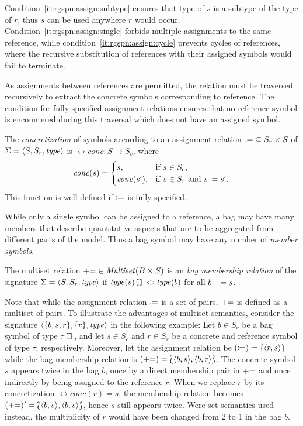 Condition~\ref{it:rgspn:assign:subtype} ensures that type of \(s\) is a subtype of the type of \(r\), thus \(s\) can be used anywhere \(r\) would occur. Condition~\ref{it:rgspn:assign:single} forbids multiple assignments to the same reference, while condition~\ref{it:rgspn:assign:cycle} prevents cycles of references, where the recursive substitution of references with their assigned symbols would fail to terminate.

As assignments between references are permitted, the relation  must be traversed recursively to extract the concrete symbols corresponding to reference. The condition for fully specified assignment relations ensures that no reference symbol is encountered during this traversal which does not have an assigned symbol. 
\begin{dfn}
  The \emph{concretization} of symbols according to an  assignment relation \({\coloneq} \subseteq S_r \times S\) of \(\Sigma = \langle S, S_r, \textrm{\itshape type\/} \rangle\) is \(\rel{conc}\colon S \to S_c\), where
  \begin{equation}
    \textrm{\itshape conc\/}(s) = \begin{cases}
      s, & \text{if \(s \in S_c\),} \\
      \textrm{\itshape conc\/}(s'), & \text{if \(s \in S_r\) and \(s \coloneq s'\).}
    \end{cases}
  \end{equation}
  This function is well-defined if \(\coloneq\) is fully specified.
\end{dfn}

While only a single symbol can be assigned to a reference, a bag may have many members that describe quantitative aspects that are to be aggregated from different parts of the model. Thus a bag symbol may have any number of \emph{member symbols}.
\begin{dfn}
  The multiset relation \({\mathrel{{+}{=}}} \in \textrm{\itshape Multiset\/}(B \times S)\) is an \emph{ bag membership relation} of the signature \(\Sigma = \langle S, S_r, \textrm{\itshape type\/} \rangle\) if \(\textrm{\itshape type\/}(s)\mathclose{\texttt{[]}} \mathrel{<\vcentcolon} \textrm{\itshape type\/}(b)\) for all \(b \mathrel{{+}{=}} s\).
\end{dfn}

Note that while the assignment relation \(\coloneq\) is a set of pairs, \(\mathrel{{+}{=}}\) is defined as a multiset of pairs. To illustrate the advantages of multiset semantics, consider the signature \(\langle \{b, s, r\}, \{r\}, \textrm{\itshape type\/} \rangle\) in the following example: Let \(b \in S_c\) be a bag symbol of type \(\tau\mathclose{\texttt{[]}}\), and let \(s \in S_c\) and \(r \in S_r\) be a concrete and reference symbol of type $\tau$, respectively. Moreover, let the assignment relation be \((\coloneq) = \{\langle r, s\rangle\}\) while the bag membership relation is \((\mathrel{{+}{=}}) = \Lbag \langle b, s\rangle, \langle b, r\rangle\Rbag\). The concrete symbol \(s\) appears twice in the bag \(b\), once by a direct membership pair in \(\mathrel{{+}{=}}\) and once indirectly by being assigned to the reference \(r\). When we replace \(r\) by its concretization \(\rel{conc}(r) = s\), the membership relation becomes \((\mathrel{{+}{=}})' = \Lbag \langle b, s\rangle, \langle b, s\rangle\Rbag\), hence \(s\) still appears twice. Were set semantics used instead, the multiplicity of \(r\) would have been changed from 2 to 1 in the bag \(b\).

